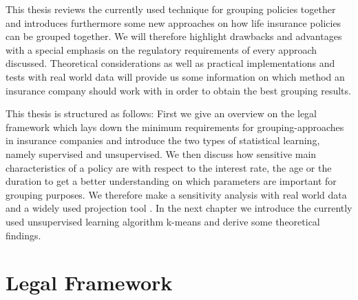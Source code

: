 This thesis reviews the currently used technique for grouping policies together and introduces furthermore some new approaches on how life insurance policies can be grouped together. We will therefore highlight drawbacks and advantages with a special emphasis on the regulatory requirements of every approach discussed. Theoretical considerations as well as practical implementations and tests with real world data will provide us some information on which method an insurance company should work with in order to obtain the best grouping results.  

This thesis is structured as follows: First we give an overview on the legal framework which lays down the minimum requirements for grouping-approaches in insurance companies and introduce the two types of statistical learning, namely supervised and unsupervised. We then discuss how sensitive main characteristics of a policy are with respect to the interest rate, the age or the duration to get a better understanding on which parameters are important for grouping purposes. We therefore make a sensitivity analysis with real world data and a widely used projection tool . In the next chapter we introduce the currently used unsupervised learning algorithm k-means and derive some theoretical findings. 


\section{Legal Framework}

